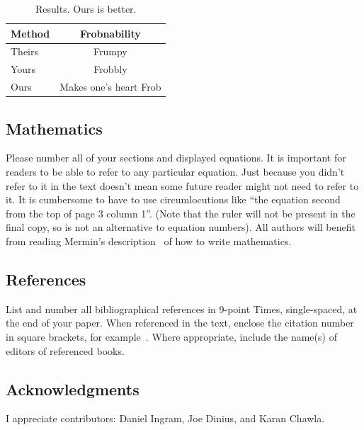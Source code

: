 \documentclass{bmvc2k}
\begin{document}
\begin{table}
\begin{center}
\begin{tabular}{|l|c|}
\hline
Method & Frobnability \\
\hline\hline
Theirs & Frumpy \\
Yours & Frobbly \\
Ours & Makes one's heart Frob\\
\hline
\end{tabular}
\end{center}
\caption{Results.   Ours is better.}
\end{table}

\subsection{Mathematics}

Please number all of your sections and displayed equations.  It is
important for readers to be able to refer to any particular equation.  Just
because you didn't refer to it in the text doesn't mean some future reader
might not need to refer to it.  It is cumbersome to have to use
circumlocutions like ``the equation second from the top of page 3 column
1''.  (Note that the ruler will not be present in the final copy, so is not
an alternative to equation numbers).  All authors will benefit from reading
Mermin's description~\cite{Mermin89} of how to write mathematics.


\subsection{References}

List and number all bibliographical references in 9-point Times,
single-spaced, at the end of your paper. When referenced in the text,
enclose the citation number in square brackets, for
example~\cite{Authors06}.  Where appropriate, include the name(s) of
editors of referenced books.


\subsection{Acknowledgments}

I appreciate contributors: Daniel Ingram, Joe Dinius, and Karan Chawla.


\end{document}
